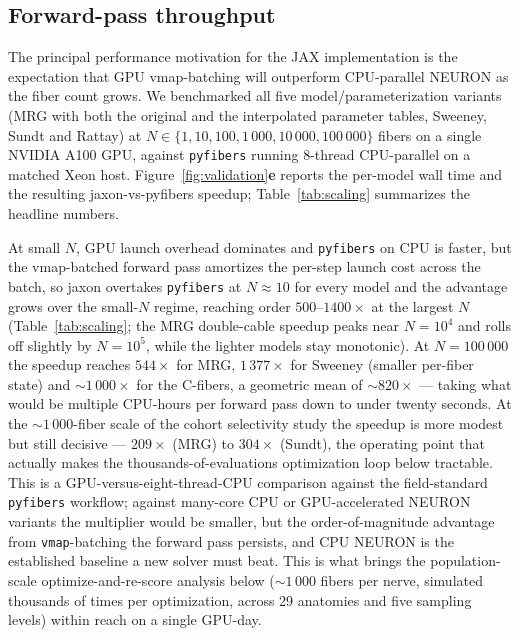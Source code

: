 \subsection{Forward-pass throughput}
\label{sec:results-scaling}

The principal performance motivation for the JAX implementation is
the expectation that GPU vmap-batching will outperform CPU-parallel
NEURON as the fiber count grows.  We benchmarked all five
model/parameterization variants (MRG with both the original and the
interpolated parameter tables, Sweeney, Sundt and Rattay) at
$N \in \{1, 10, 100, 1\,000, 10\,000, 100\,000\}$ fibers on a single
NVIDIA A100 GPU, against \texttt{pyfibers} running 8-thread
CPU-parallel on a matched Xeon host.
Figure~\ref{fig:validation}\textbf{e} reports the per-model wall time
and the resulting jaxon-vs-pyfibers speedup;
Table~\ref{tab:scaling} summarizes the headline numbers.

At small $N$, GPU launch overhead dominates and \texttt{pyfibers} on
CPU is faster, but the vmap-batched forward pass amortizes the per-step
launch cost across the batch, so jaxon overtakes \texttt{pyfibers} at
$N \approx 10$ for every model and the advantage grows over the small-$N$
regime, reaching order $500$--$1400\times$ at the largest $N$
(Table~\ref{tab:scaling}; the MRG double-cable speedup peaks near
$N=10^4$ and rolls off slightly by $N=10^5$, while the lighter models
stay monotonic).  At $N=100\,000$ the speedup reaches
$544\times$ for MRG, $1\,377\times$ for Sweeney (smaller per-fiber
state) and ${\sim}1\,000\times$ for the C-fibers, a geometric mean of
$\sim\!820\times$ --- taking what would be multiple CPU-hours per
forward pass down to under twenty seconds.  At the ${\sim}1\,000$-fiber
scale of the cohort selectivity study the speedup is more modest but
still decisive --- $209\times$ (MRG) to $304\times$ (Sundt), the
operating point that actually makes the thousands-of-evaluations
optimization loop below tractable.  This is a GPU-versus-eight-thread-CPU
comparison against the field-standard \texttt{pyfibers} workflow; against
many-core CPU or GPU-accelerated NEURON variants the multiplier would be
smaller, but the order-of-magnitude advantage from \texttt{vmap}-batching the
forward pass persists, and CPU NEURON is the established baseline a new solver
must beat.  This is what brings the
population-scale optimize-and-re-score analysis below
($\sim\!1\,000$ fibers per nerve, simulated thousands of times per
optimization, across 29 anatomies and five sampling levels) within
reach on a single GPU-day.

